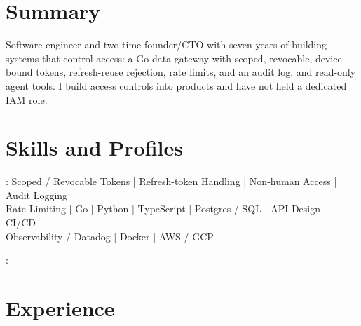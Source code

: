 \documentclass[print]{jack-resume}
\begin{document}
\pagecolor{darkmodeBackground}


\begin{minipage}[t][1cm][t]{.03\textwidth}
    \hfill
\end{minipage}

\section{Summary}
Software engineer and two-time founder/CTO with seven years of building systems that control access: a Go data gateway with scoped, revocable, device-bound tokens, refresh-reuse rejection, rate limits, and an audit log, and read-only agent tools. I build access controls into products and have not held a dedicated IAM role.
\sectionsep

\section{Skills and Profiles}
:
Scoped / Revocable Tokens \hfill | \hfill
Refresh-token Handling \hfill | \hfill
Non-human Access \hfill | \hfill
Audit Logging \\
\hspace{1.0cm} Rate Limiting \hfill | \hfill
Go \hfill | \hfill
Python \hfill | \hfill
TypeScript \hfill | \hfill
Postgres / SQL \hfill | \hfill
API Design \hfill | \hfill
CI/CD \\
\hspace{1.0cm} Observability / Datadog \hfill | \hfill
Docker \hfill | \hfill
AWS / GCP \\

\raggedright{
    :
      \href{https://www.linkedin.com/in/jack-sturtevant/}{ \ExternalLink} |
     \href{https://github.com/jacksturt}{ \ExternalLink}}

\section{Experience}
\end{document}
